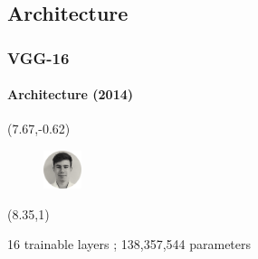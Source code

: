 \renewcommand{\arraystretch}{1.1}

\subsection{Architecture}
\begin{frame}
\frametitle{VGG-16}
\framesubtitle{Architecture (2014)} 

\begin{textblock}{15}(7.67,-0.62)
	\begin{figure}[H]
		\includegraphics[width=0.1\textwidth]{Images/Team/DamienTOOMEY.png} 
	\end{figure}
\end{textblock}

\begin{textblock}{1}(8.35,1)
	\centerline{16 trainable layers ; 138,357,544 parameters}
\end{textblock}

\begin{center}


\end{center}
\end{frame}
